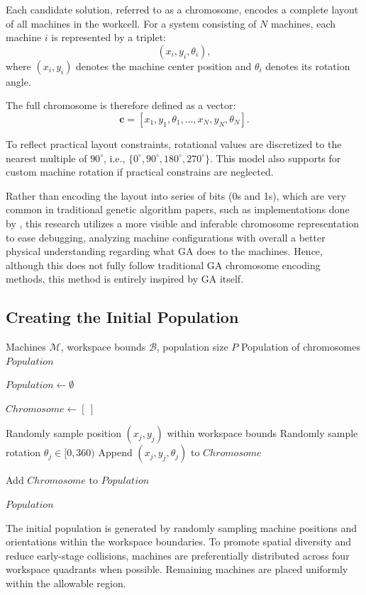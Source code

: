 \documentclass{article}
\begin{document}
Each candidate solution, referred to as a chromosome, encodes a complete layout of all machines in the workcell. For a system consisting of $N$ machines, each machine $i$ is represented by a triplet:
\[
(x_i, y_i, \theta_i),
\]
where $(x_i, y_i)$ denotes the machine center position and $\theta_i$ denotes its rotation angle.

The full chromosome is therefore defined as a vector:
\[
\mathbf{c} = [x_1, y_1, \theta_1, \dots, x_N, y_N, \theta_N].
\]

To reflect practical layout constraints, rotational values are discretized to the nearest multiple of $90^\circ$, i.e., $\{0^\circ, 90^\circ, 180^\circ, 270^\circ\}$. This model also supports for custom machine rotation if practical constrains are neglected.

Rather than encoding the layout into series of bits (0s and 1s), which are very common in traditional genetic algorithm papers, such as implementations done by \textcite{sim2005rwl}, this research utilizes a more visible and inferable chromosome representation to ease debugging, analyzing machine configurations with overall a better physical understanding regarding what GA does to the machines. Hence, although this does not fully follow traditional GA chromosome encoding methods, this method is entirely inspired by GA itself.
\subsection{Creating the Initial Population}
\begin{algorithm}[H]
\caption{Initial Population Generation}
\label{alg:init_population}
\begin{algorithmic}[1]
\Require Machines $\mathcal{M}$, workspace bounds $\mathcal{B}$, population size $P$
\Ensure Population of chromosomes $Population$

\State $Population \gets \emptyset$

    \State $Chromosome \gets [\ ]$
    
        \State Randomly sample position $(x_j, y_j)$ within workspace bounds
        \State Randomly sample rotation $\theta_j \in [0, 360)$
        \State Append $(x_j, y_j, \theta_j)$ to $Chromosome$
    \EndFor
    
    \State Add $Chromosome$ to $Population$
\EndFor

\State \Return $Population$
\end{algorithmic}
\end{algorithm}
The initial population is generated by randomly sampling machine positions and orientations within the workspace boundaries. To promote spatial diversity and reduce early-stage collisions, machines are preferentially distributed across four workspace quadrants when possible. Remaining machines are placed uniformly within the allowable region.
\end{document}
